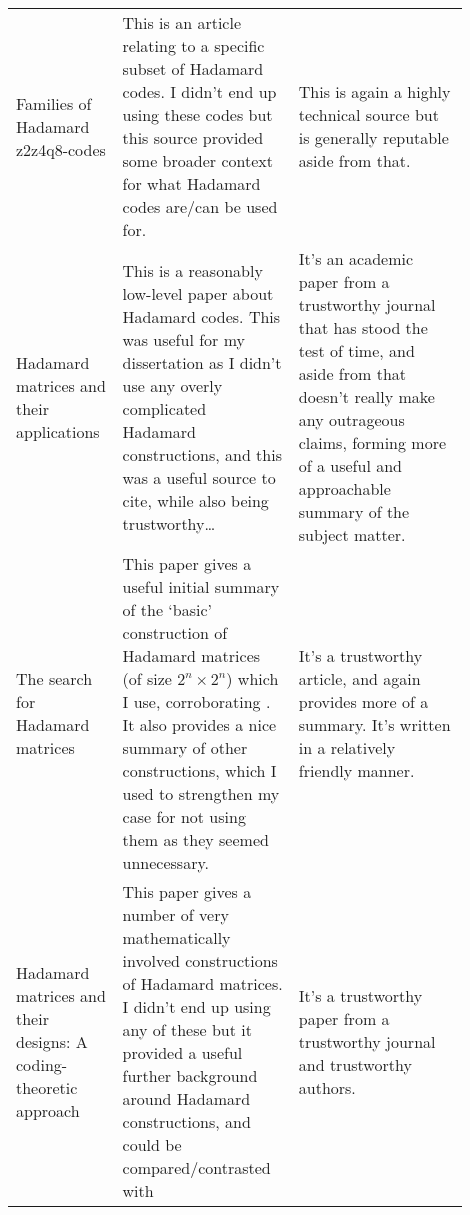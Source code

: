 \documentclass[a4paper,11pt]{article}
\begin{document}
\begin{center}
{\begin{longtable}{p{0.2\linewidth} p{0.35\linewidth} p{0.35\linewidth}}
    Families of Hadamard z2z4q8-codes \cite{HadamardZ2Z2012RioRifa} &

    This is an article relating to a specific subset of Hadamard codes. I
    didn't end up using these codes but this source provided some broader
    context for what Hadamard codes are/can be used for. &

    This is again a highly technical source but is generally reputable aside
    from that. \\

    Hadamard matrices and their applications \cite{HadamardMatrices1978HedayatWallis} &

    This is a reasonably low-level paper about Hadamard codes. This was useful
    for my dissertation as I didn't use any overly complicated Hadamard
    constructions, and this was a useful source to cite, while also being
    trustworthy\ldots &

    It's an academic paper from a trustworthy journal that has stood the test
    of time, and aside from that doesn't really make any outrageous claims,
    forming more of a useful and approachable summary of the subject matter. \\

    The search for Hadamard matrices \cite{HadamardSearch1963GolombBaumert} &

    This paper gives a useful initial summary of the `basic' construction of
    Hadamard matrices (of size $2^n \times 2^n$)  which I use, corroborating
    \cite{HadamardMatrices1978HedayatWallis}. It also provides a nice summary
    of other constructions, which I used to strengthen my case for not using
    them as they seemed unnecessary. &

    It's a trustworthy article, and again provides more of a summary. It's
    written in a relatively friendly manner. \\

    Hadamard matrices and their designs: A coding-theoretic approach \cite{HadamardCodingTheoretic1992AssmusKey} &

    This paper gives a number of very mathematically involved constructions of
    Hadamard matrices. I didn't end up using any of these but it provided a
    useful further background around Hadamard constructions, and could be
    compared/contrasted with \cite{HadamardSearch1963GolombBaumert} &

    It's a trustworthy paper from a trustworthy journal and trustworthy
    authors. \\


\end{longtable}}
\end{center}
\end{document}
